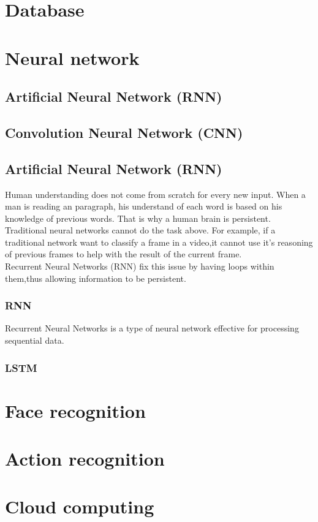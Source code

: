 \section{Database}
\section{Neural network}
\subsection{Artificial Neural Network (RNN)}
\subsection{Convolution Neural Network (CNN)}

\subsection{Artificial Neural Network (RNN)}
Human understanding does not come from scratch for every new input. When a man is reading an paragraph, his understand of each word is based on his knowledge of previous words. That is why a human brain is persistent.\\
Traditional neural networks cannot do the task above. For example, if a traditional network want to classify a frame in a video,it cannot use it's reasoning of previous frames to help with the result of the current frame. \\
Recurrent Neural Networks (RNN) fix this issue by having loops within them,thus allowing information to be persistent.
\subsubsection{RNN}
Recurrent Neural Networks is a type of neural network effective for processing sequential data.
\subsubsection{LSTM}


\section{Face recognition}
\section{Action recognition}
\section{Cloud computing}
